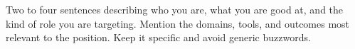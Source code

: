Two to four sentences describing who you are, what you are good at, and the kind of role you are targeting. Mention the domains, tools, and outcomes most relevant to the position. Keep it specific and avoid generic buzzwords.
